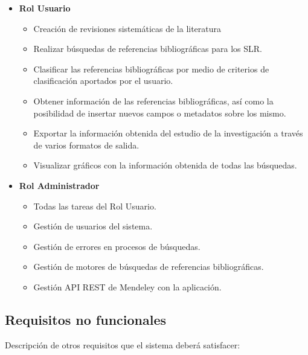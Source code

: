 \begin{itemize}
	\item \textbf{Rol Usuario}
		\begin{itemize}
			\item Creación de revisiones sistemáticas de la literatura
			\item Realizar búsquedas de referencias bibliográficas para los SLR.
			\item Clasificar las referencias bibliográficas por medio de criterios de clasificación aportados por el usuario.
			\item Obtener información de las referencias bibliográficas, así como la posibilidad de insertar nuevos campos o metadatos sobre los mismo.
			\item Exportar la información obtenida del estudio de la investigación a través de varios formatos de salida.
			\item Visualizar gráficos con la información obtenida de todas las búsquedas.
	\end{itemize}
	\item \textbf{Rol Administrador}
	
	\begin{itemize}
		\item Todas las tareas del Rol Usuario.
		\item Gestión de usuarios del sistema.
		\item Gestión de errores en procesos de búsquedas.
		\item Gestión de motores de búsquedas de referencias bibliográficas.
		\item Gestión API REST de Mendeley con la aplicación.
	\end{itemize}
\end{itemize}

\subsection{Requisitos no funcionales}
Descripción de otros requisitos que el sistema deberá satisfacer:

